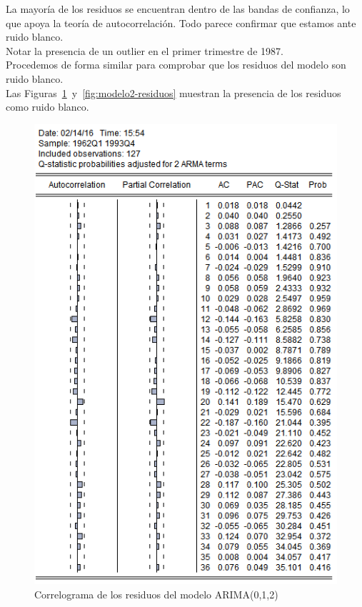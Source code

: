 \documentclass[12pt,a4paper,twoside,openright,titlepage,final]{article}
\begin{document}
La mayoría de los residuos se encuentran dentro de las bandas de confianza, lo que apoya la teoría de autocorrelación. Todo parece confirmar que estamos ante ruido blanco.\\

Notar la presencia de un outlier en el primer trimestre de 1987.\\

Procedemos de forma similar para comprobar que los residuos del modelo son ruido blanco.\\

Las Figuras~\ref{fig:modelo2-residuos-correlograma}~y~\ref{fig:modelo2-residuos} muestran la presencia de los residuos como ruido blanco.\\ 
 
\begin{figure}[tbph!]
	\centering
	\includegraphics[width=0.7\linewidth]{imagenes/empleo/modelo2-residuos-correlograma.png}
	\caption{Correlograma de los residuos del modelo ARIMA(0,1,2)}
	\label{fig:modelo2-residuos-correlograma}
\end{figure}
\end{document}
